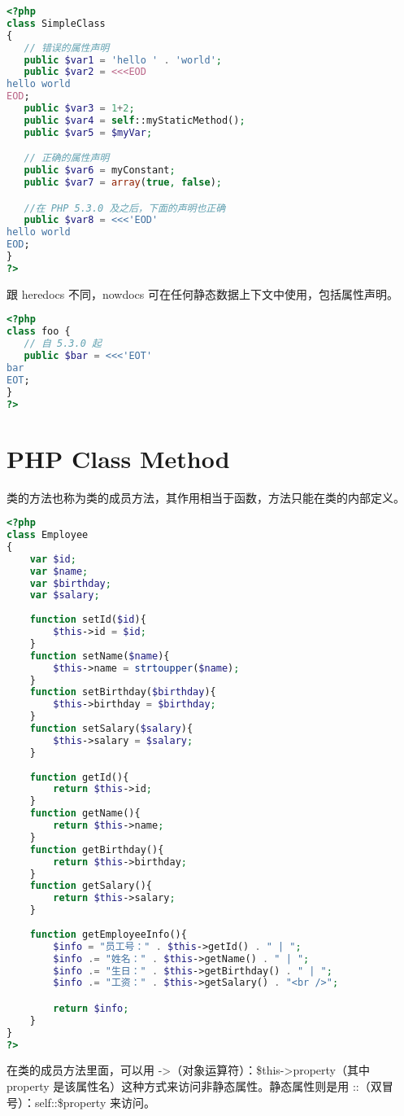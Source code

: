 \begin{lstlisting}[language=PHP]
<?php
class SimpleClass
{
   // 错误的属性声明
   public $var1 = 'hello ' . 'world';
   public $var2 = <<<EOD
hello world
EOD;
   public $var3 = 1+2;
   public $var4 = self::myStaticMethod();
   public $var5 = $myVar;

   // 正确的属性声明
   public $var6 = myConstant;
   public $var7 = array(true, false);

   //在 PHP 5.3.0 及之后，下面的声明也正确
   public $var8 = <<<'EOD'
hello world
EOD;
}
?>
\end{lstlisting}

跟 heredocs 不同，nowdocs 可在任何静态数据上下文中使用，包括属性声明。

\begin{lstlisting}[language=PHP]
<?php
class foo {
   // 自 5.3.0 起
   public $bar = <<<'EOT'
bar
EOT;
}
?>
\end{lstlisting}


\chapter{PHP Class Method}

类的方法也称为类的成员方法，其作用相当于函数，方法只能在类的内部定义。

\begin{lstlisting}[language=PHP]
<?php
class Employee
{
	var $id;
	var $name;
	var $birthday;
	var $salary;
	
	function setId($id){
		$this->id = $id;
	}
	function setName($name){
		$this->name = strtoupper($name);
	}
	function setBirthday($birthday){
		$this->birthday = $birthday;
	}
	function setSalary($salary){
		$this->salary = $salary;
	}
	
	function getId(){
		return $this->id;
	}
	function getName(){
		return $this->name;
	}
	function getBirthday(){
		return $this->birthday;
	}
	function getSalary(){
		return $this->salary;
	}
	
	function getEmployeeInfo(){
		$info = "员工号：" . $this->getId() . " | ";
		$info .= "姓名：" . $this->getName() . " | ";
		$info .= "生日：" . $this->getBirthday() . " | ";
		$info .= "工资：" . $this->getSalary() . "<br />";

		return $info;
	}
}
?>
\end{lstlisting}

在类的成员方法里面，可以用 ->（对象运算符）：\$this->property（其中 property 是该属性名）这种方式来访问非静态属性。静态属性则是用 ::（双冒号）：self::\$property 来访问。



